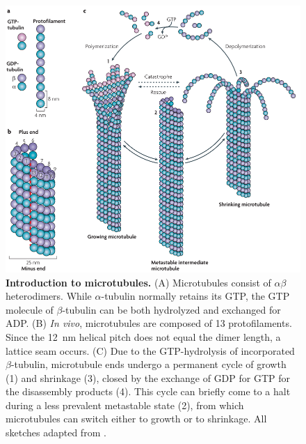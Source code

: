 \begin{figure}[h!tb]
\centering
\includegraphics[width=\linewidth]{Figures/MTintro.png}
\caption[Introduction to microtubules.]{\textbf{Introduction to microtubules.}
(A) Microtubules consist of $\alpha\beta$ heterodimers. While $\alpha$-tubulin normally retains its GTP, the GTP molecule of $\beta$-tubulin can be both hydrolyzed and exchanged for ADP. (B) \textit{In vivo}, microtubules are composed of 13 protofilaments. Since the \SI{12}{\nm} helical pitch does not equal the dimer length, a lattice seam occurs. (C) Due to the GTP-hydrolysis of incorporated $\beta$-tubulin, microtubule ends undergo a permanent cycle of growth (1) and shrinkage (3), closed by the exchange of GDP for GTP for the disassembly products (4). This cycle can briefly come to a halt during a less prevalent metastable state (2), from which microtubules can switch either to growth or to shrinkage. All sketches adapted from \cite{Akhmanova2008}.
	}\label{microtubuleintro}
\end{figure}

\FloatBarrier

